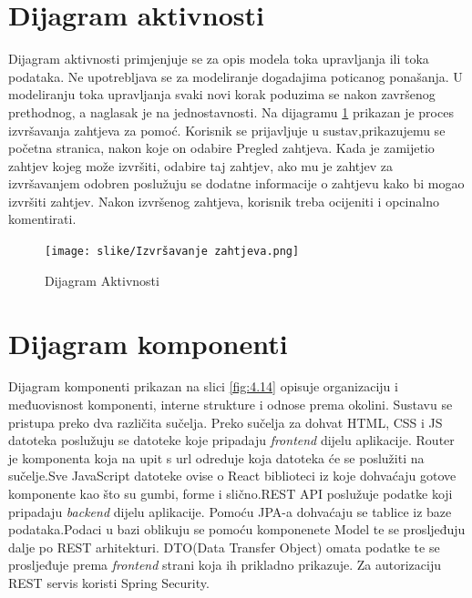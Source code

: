 		\section{Dijagram aktivnosti}
			
		
			
			\text Dijagram aktivnosti primjenjuje se za opis modela toka upravljanja ili toka podataka. Ne upotrebljava se za modeliranje dogadajima poticanog ponašanja. U modeliranju toka upravljanja svaki novi korak poduzima se nakon završenog prethodnog, a naglasak je na jednostavnosti. Na dijagramu \ref{fig:4.13} prikazan je proces izvršavanja zahtjeva za pomoć. Korisnik se prijavljuje u sustav,prikazujemu se početna stranica, nakon koje on odabire Pregled zahtjeva. Kada je zamijetio zahtjev kojeg može izvršiti, odabire taj zahtjev, ako mu je zahtjev za izvršavanjem odobren poslužuju se dodatne informacije o zahtjevu kako bi mogao izvršiti zahtjev. Nakon izvršenog zahtjeva, korisnik treba ocijeniti i opcinalno komentirati.
			
			
		\begin{figure}[H]
			\texttt{[image: slike/Izvršavanje zahtjeva.png]} %
			\centering
			\caption { Dijagram Aktivnosti}
			\label{fig:4.13}
			\end{figure}

\newpage
		\section{Dijagram komponenti}
		
		
			
			\text   Dijagram komponenti prikazan na slici \ref{fig:4.14} opisuje organizaciju i međuovisnost
            komponenti, interne strukture i odnose prema okolini. Sustavu se pristupa preko dva različita sučelja. Preko sučelja za dohvat HTML, CSS i JS datoteka poslužuju se
            datoteke koje pripadaju \emph{frontend} dijelu aplikacije. Router je komponenta koja na
            upit s url odreduje koja datoteka će se poslužiti na sučelje.Sve JavaScript datoteke ovise o React biblioteci iz koje dohvaćaju gotove komponente kao što su gumbi, forme i slično.REST API poslužuje
            podatke koji pripadaju \emph{backend} dijelu aplikacije. Pomoću JPA-a dohvaćaju se tablice iz baze podataka.Podaci  u bazi oblikuju se pomoću komponenete Model te se prosljeđuju dalje po REST arhitekturi. DTO(Data Transfer Object) omata podatke te se prosljeđuje prema \emph{frontend} strani koja ih prikladno prikazuje. Za autorizaciju REST servis koristi Spring Security.
			
